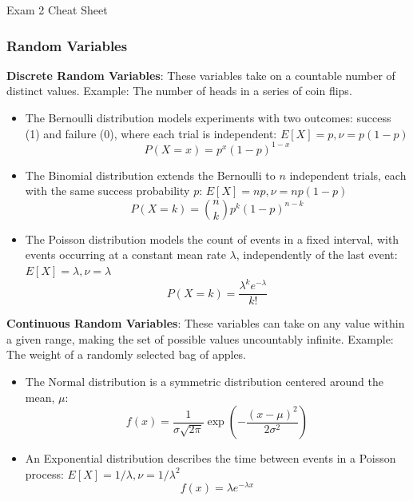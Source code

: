 \begin{cheatsheet}{Exam 2 Cheat Sheet}
    \small{
        \subsubsection*{Random Variables}

        \item \textbf{Discrete Random Variables}: These variables take on a countable number of distinct values. Example: The number of heads in a series of coin flips.
        \begin{itemize}
            \item The Bernoulli distribution models experiments with two outcomes: success (1) and failure (0), where each trial is independent: $E[X] = p, \nu = p(1-p)$
            \begin{equation*}
                P(X = x) = p^x(1-p)^{1-x}
            \end{equation*}
            \item The Binomial distribution extends the Bernoulli to $n$ independent trials, each with the same success probability $p$: $E[X] = np, \nu = np(1-p)$
            \begin{equation*}
                P(X = k) = \binom{n}{k} p^k(1-p)^{n-k}
            \end{equation*}
            \item The Poisson distribution models the count of events in a fixed interval, with events occurring at a constant mean rate $\lambda$, independently of the last event: $E[X] = \lambda, \nu = \lambda$
            \begin{equation*}
                P(X = k) = \frac{\lambda^k e^{-\lambda}}{k!}
            \end{equation*}
        \end{itemize}
        \item \textbf{Continuous Random Variables}: These variables can take on any value within a given range, making the set of possible values uncountably infinite. Example: The weight of a randomly 
        selected bag of apples.
        \begin{itemize}
            \item The Normal distribution is a symmetric distribution centered around the mean, $\mu$:
            \begin{equation*}
                f(x) = \frac{1}{\sigma\sqrt{2\pi}} \exp\left(-\frac{(x-\mu)^2}{2\sigma^2}\right)
            \end{equation*}
            \item An Exponential distribution describes the time between events in a Poisson process: $E[X] = 1 / \lambda, \nu = 1 / \lambda^{2}$
            \begin{equation*}
                f(x) = \lambda e^{-\lambda x}
            \end{equation*}
        \end{itemize}
    
}
\end{cheatsheet}
